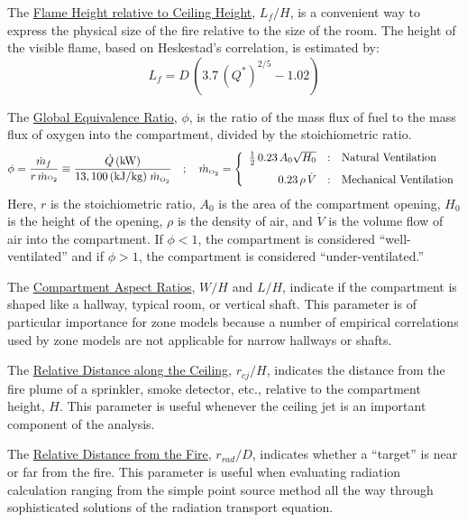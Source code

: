 \documentclass[fleqn,b5paper]{article}
\begin{document}
The \underline{Flame Height relative to Ceiling Height}, $L_f/H$, is a convenient way to express the physical size of the fire relative to the size of the room. The height of the visible flame, based on Heskestad's correlation, is estimated by:
\begin{equation} L_f = D \, \left( 3.7 \, (Q^*)^{2/5} - 1.02 \right) \end{equation}

The \underline{Global Equivalence Ratio}, $\phi$, is the ratio of the mass flux of fuel to the mass flux of oxygen into the compartment, divided by the stoichiometric ratio.
\begin{equation} \phi = \frac{\dot{m}_f}{r\, \dot{m}{\hbox{\tiny O$_2$}}} \equiv  \frac{\dot{Q} \, \hbox{(kW)}}{13,100 \, \hbox{(kJ/kg)} \; \dot{m}_{\hbox{\tiny O$_2$}} } \quad ; \quad  \dot{m}_{\hbox{\tiny O$_2$}} = \left\{
   \begin{array}{r@{\quad:\quad}l}
      \frac{1}{2} \, 0.23 \, A_0 \sqrt{H_0} & \hbox{Natural Ventilation} \\[0.1in]
      0.23 \, \rho \, \dot{V}       & \hbox{Mechanical Ventilation} \end{array} \right.
\end{equation}
Here, $r$ is the stoichiometric ratio, $A_0$ is the area of the compartment opening, $H_0$ is the height of the opening, $\rho$ is the density of air, and $\dot{V}$ is the volume flow of air into the compartment. If $\phi<1$, the compartment is considered ``well-ventilated'' and if $\phi>1$, the compartment is considered ``under-ventilated.''

The \underline{Compartment Aspect Ratios}, $W/H$ and $L/H$, indicate if the compartment is shaped like a hallway, typical room, or vertical shaft. This parameter is of particular importance for zone models because a number of empirical correlations used by zone models are not applicable for narrow hallways or shafts.

The \underline{Relative Distance along the Ceiling}, $r_{cj}/H$, indicates the distance from the fire plume of a sprinkler, smoke detector, etc., relative to the compartment height, $H$. This parameter is useful whenever the ceiling jet is an important component of the analysis.

The \underline{Relative Distance from the Fire}, $r_{rad}/D$, indicates whether a ``target'' is near or far from the fire. This parameter is useful when evaluating radiation calculation ranging from the simple point source method all the way through sophisticated solutions of the radiation transport equation.


\end{document}
